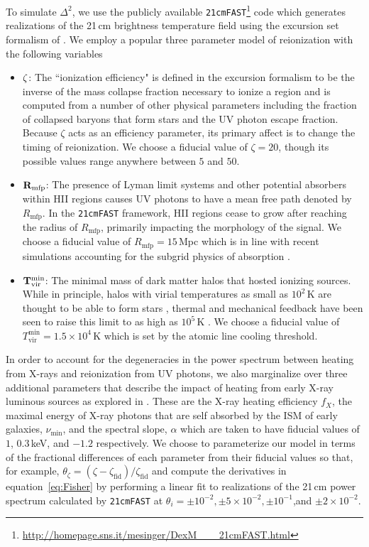 \documentclass[twocolumn]{emulateapj}
\begin{document}
To simulate $\Delta^2$, we use the publicly available {\tt 21cmFAST}\footnote{\url{http://homepage.sns.it/mesinger/DexM___21cmFAST.html}} code \citep{Mesinger:2011} which generates realizations of the 21\,cm brightness temperature field using the excursion set formalism of \citet{Furlanetto:2004}. We employ a popular three parameter model of reionization \citep{Mesinger:2012} with the following variables 
\begin{itemize}
\item ${\bf \zeta}$: The ``ionization efficiency" is defined in the \citet{Furlanetto:2004} excursion formalism to be the inverse of the mass collapse fraction necessary to ionize a region and is computed from a number of other physical parameters including the fraction of collapsed baryons that form stars and the UV photon escape fraction. Because $\zeta$ acts as an efficiency parameter, its primary affect is to change the timing of reionization. We choose a fiducial value of $\zeta=20$, though its possible values range anywhere between $5$ and $50$. 
\item ${\bf R_\text{mfp}}$: The presence of Lyman limit systems and other potential absorbers within HII regions causes UV photons to have a mean free path denoted by $R_\text{mfp}$. In the {\tt 21cmFAST} framework, HII regions cease to grow after reaching the radius of $R_\text{mfp}$, primarily impacting the morphology of the signal. We choose a fiducial value of $R_\text{mfp}=15$\,Mpc which is in line with recent simulations accounting for the subgrid physics of absorption \citep{Sobacchi:2014}. 
\item ${\bf T_\text{vir}^\text{min}}$: The minimal mass of dark matter halos that hosted ionizing sources. While in principle, halos with virial temperatures as small as $10^2$\,K are thought to be able to form stars \citep{Haiman:1996a,Tegmark:1997c}, thermal and mechanical feedback have been seen to raise this limit to as high as $10^5$\,K \citep{Springel:2003,Mesinger:2008,Okamoto:2008}. We choose a fiducial value of $T_\text{vir}^\text{min} = 1.5\times 10^4$\,K which is set by the atomic line cooling threshold. 
\end{itemize}
In order to account for the degeneracies in the power spectrum between heating from X-rays and reionization from UV photons, we also marginalize over three additional parameters that describe the impact of heating from early X-ray luminous sources as explored in \citep{EwallWice:2015b}. These are the X-ray heating efficiency $f_X$, the maximal energy of X-ray photons that are self absorbed by the ISM of early galaxies, $\nu_\text{min}$, and the spectral slope, $\alpha$ which are taken to have fiducial values of $1$, $0.3$\,keV, and $-1.2$ respectively. We choose to parameterize our model in terms of the fractional differences of each parameter from their fiducial values so that, for example, $\theta_\zeta = (\zeta - \zeta_\text{fid})/\zeta_\text{fid}$ and compute the derivatives in equation~\ref{eq:Fisher} by performing a linear fit to realizations of the 21\,cm power spectrum calculated by {\tt 21cmFAST} at $\theta_i= \pm 10^{-2}, \pm 5\times 10^{-2}, \pm 10^{-1}$,and $ \pm 2 \times 10^{-2}$. 
\end{document}
